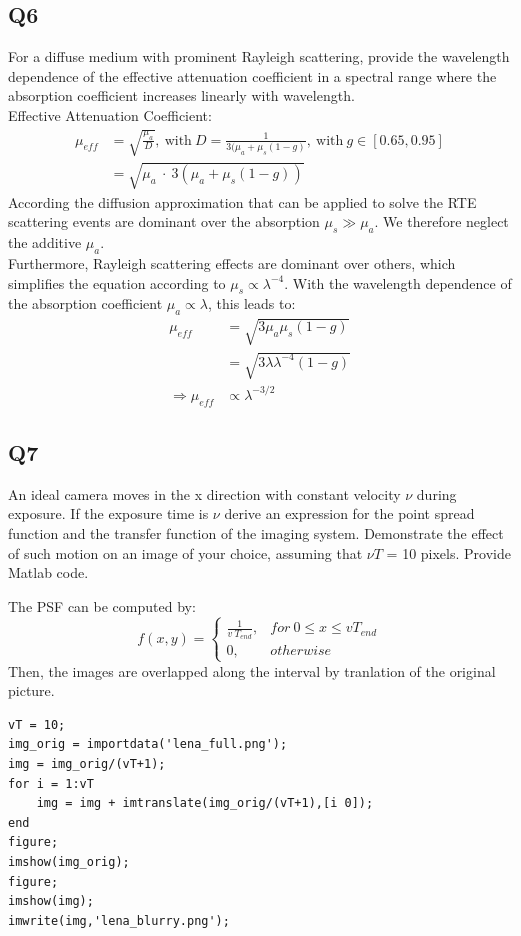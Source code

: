 \subsection*{Q6}
For a diffuse medium with prominent Rayleigh scattering, provide the wavelength dependence of the effective attenuation coefficient in a spectral range where the absorption coefficient increases linearly with wavelength.\\
Effective Attenuation Coefficient:\\
\begin{align}
    \mu_{eff} &= \sqrt{\frac{\mu_a}{D}},\ \mathrm{with}\ D = \frac{1}{3(\mu_a + \mu_s(1-g)},\ \mathrm{with}\ g \in [0.65,0.95] \\
    &= \sqrt{\mu_a\ \cdot\ 3(\mu_a + \mu_s(1-g))}
\end{align}
According the diffusion approximation that can be applied to solve the RTE scattering events are dominant over the absorption $\mu_s \gg \mu_a$. We therefore neglect the additive $\mu_a$.\\
Furthermore, Rayleigh scattering effects are dominant over others, which simplifies the equation according to $\mu_s \propto \lambda^{-4}$. With the wavelength dependence of the absorption coefficient $\mu_a \propto \lambda$, this leads to:
\begin{align}
\mu_{eff} &= \sqrt{3\mu_a\mu_s(1-g)}\\
&= \sqrt{3\lambda\lambda^{-4}(1-g)}\\
\Rightarrow \mu_{eff} &\propto \lambda^{-3/2}
\end{align}

\subsection*{Q7}
An ideal camera moves in the x direction with constant velocity $\nu$ during exposure. If the exposure time is $\nu$ derive an expression for the point spread function and the transfer function of the imaging system. Demonstrate the effect of such motion on an image of your choice, assuming that $\nu T$ = 10 pixels. Provide Matlab code.

The PSF can be computed by:
\begin{equation}
f(x,y) = \begin{cases} \frac{1}{v\ T_{end}}, &for\ 0 \leq x \leq v T_{end} \\ 0, &otherwise \end{cases}
\end{equation}
Then, the images are overlapped along the interval by tranlation of the original picture.
\begin{lstlisting}
vT = 10;
img_orig = importdata('lena_full.png');
img = img_orig/(vT+1);
for i = 1:vT
    img = img + imtranslate(img_orig/(vT+1),[i 0]);
end
figure;
imshow(img_orig);
figure;
imshow(img);
imwrite(img,'lena_blurry.png');
\end{lstlisting}

